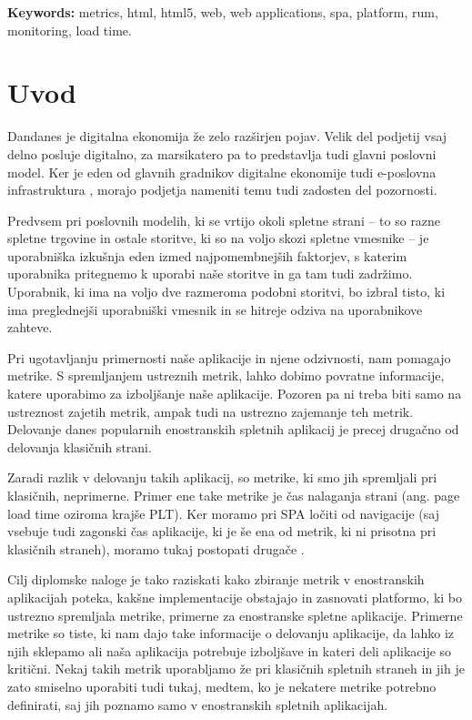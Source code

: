 \documentclass[a4paper, 12pt]{book}
\newcommand{\tkeywordsEn}{metrics, html, html5, web, web applications, spa, platform, rum, monitoring, load time}
\newcommand{\clearemptydoublepage}{\newpage{\pagestyle{empty}\cleardoublepage}}
\begin{document}
\bigskip

\noindent\textbf{Keywords:} \tkeywordsEn.
\clearemptydoublepage

\mainmatter
\setcounter{page}{1}
\pagestyle{fancy}

\chapter{Uvod}

Dandanes je digitalna ekonomija že zelo razširjen pojav. Velik del podjetij vsaj delno posluje digitalno, za marsikatero pa to predstavlja tudi glavni poslovni model. Ker je eden od glavnih gradnikov digitalne ekonomije tudi e-poslovna infrastruktura \cite{digital_econ}, morajo podjetja nameniti temu tudi zadosten del pozornosti.

Predvsem pri poslovnih modelih, ki se vrtijo okoli spletne strani – to so razne spletne trgovine in ostale storitve, ki so na voljo skozi spletne vmesnike – je uporabniška izkušnja eden izmed najpomembnejših faktorjev, s katerim uporabnika pritegnemo k uporabi naše storitve in ga tam tudi zadržimo. Uporabnik, ki ima na voljo dve razmeroma podobni storitvi, bo izbral tisto, ki ima preglednejši uporabniški vmesnik in se hitreje odziva na uporabnikove zahteve. 

Pri ugotavljanju primernosti naše aplikacije in njene odzivnosti, nam pomagajo metrike. S spremljanjem ustreznih metrik, lahko dobimo povratne informacije, katere uporabimo za izboljšanje naše aplikacije. Pozoren pa ni treba biti samo na ustreznost zajetih metrik, ampak tudi na ustrezno zajemanje teh metrik. Delovanje danes popularnih enostranskih spletnih aplikacij je precej drugačno od delovanja klasičnih strani.

Zaradi razlik v delovanju takih aplikacij, so metrike, ki smo jih spremljali pri klasičnih, neprimerne. Primer ene take metrike je čas nalaganja strani (ang. page load time oziroma krajše PLT). Ker moramo pri SPA ločiti  od  navigacije (saj  vsebuje tudi zagonski čas aplikacije, ki je še ena od metrik, ki ni prisotna pri klasičnih straneh), moramo tukaj postopati drugače \cite{hard_vs_soft_navigation}.

Cilj diplomske naloge je tako raziskati kako zbiranje metrik v enostranskih aplikacijah poteka, kakšne implementacije obstajajo in zasnovati platformo, ki bo ustrezno spremljala metrike, primerne za enostranske spletne aplikacije. Primerne metrike so tiste, ki nam dajo take informacije o delovanju aplikacije, da lahko iz njih sklepamo ali naša aplikacija potrebuje izboljšave in kateri deli aplikacije so kritični. Nekaj takih metrik uporabljamo že pri klasičnih spletnih straneh in jih je zato smiselno uporabiti tudi tukaj, medtem, ko je nekatere metrike potrebno definirati, saj jih poznamo samo v enostranskih spletnih aplikacijah.
\end{document}
